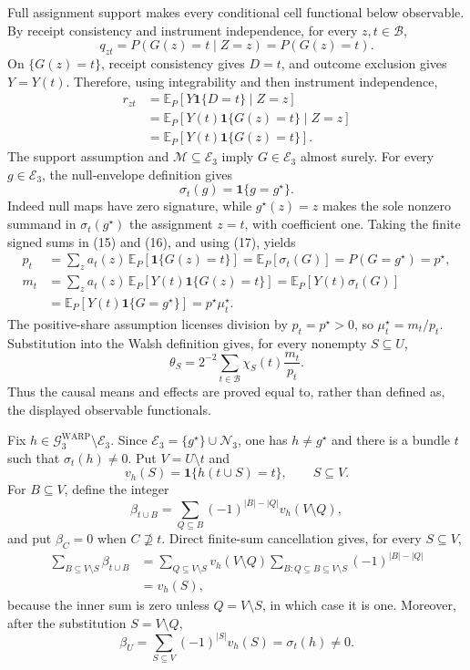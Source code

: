Full assignment support makes every conditional cell functional below observable.  By receipt consistency and instrument independence, for every \(z,t\in\mathcal B\),
\[
q_{zt}
=P(G(z)=t\mid Z=z)
=P(G(z)=t). \tag{15}
\]
On \(\{G(z)=t\}\), receipt consistency gives \(D=t\), and outcome exclusion gives \(Y=Y(t)\).  Therefore, using integrability and then instrument independence,
\[
\begin{aligned}
r_{zt}
&=\mathbb E_P\!\left[Y\mathbf 1\{D=t\}\mid Z=z\right]\\
&=\mathbb E_P\!\left[Y(t)\mathbf 1\{G(z)=t\}\mid Z=z\right]\\
&=\mathbb E_P\!\left[Y(t)\mathbf 1\{G(z)=t\}\right].
\end{aligned} \tag{16}
\]
The support assumption and \(\mathcal M\subseteq\mathcal E_3\) imply \(G\in\mathcal E_3\) almost surely.  For every \(g\in\mathcal E_3\), the null-envelope definition gives
\[
\sigma_t(g)=\mathbf 1\{g=g^\star\}. \tag{17}
\]
Indeed null maps have zero signature, while \(g^\star(z)=z\) makes the sole nonzero summand in \(\sigma_t(g^\star)\) the assignment \(z=t\), with coefficient one.  Taking the finite signed sums in (15) and (16), and using (17), yields
\[
\begin{aligned}
p_t
&=\sum_z a_t(z)\,\mathbb E_P[\mathbf 1\{G(z)=t\}]
=\mathbb E_P[\sigma_t(G)]
=P(G=g^\star)=p^\star,\\
m_t
&=\sum_z a_t(z)\,\mathbb E_P[Y(t)\mathbf 1\{G(z)=t\}]
=\mathbb E_P[Y(t)\sigma_t(G)]\\
&=\mathbb E_P[Y(t)\mathbf 1\{G=g^\star\}]
=p^\star\mu_t^\star.
\end{aligned} \tag{18}
\]
The positive-share assumption licenses division by \(p_t=p^\star>0\), so \(\mu_t^\star=m_t/p_t\).  Substitution into the Walsh definition gives, for every nonempty \(S\subseteq U\),
\[
\theta_S=2^{-2}\sum_{t\in\mathcal B}\chi_S(t)\frac{m_t}{p_t}.
\]
Thus the causal means and effects are proved equal to, rather than defined as, the displayed observable functionals.

Fix \(h\in\mathcal G^{\mathrm{WARP}}_3\setminus\mathcal E_3\).  Since \(\mathcal E_3=\{g^\star\}\cup\mathcal N_3\), one has \(h\ne g^\star\) and there is a bundle \(t\) such that \(\sigma_t(h)\ne0\).  Put \(V=U\setminus t\) and
\[
v_h(S)=\mathbf 1\{h(t\cup S)=t\},\qquad S\subseteq V.
\]
For \(B\subseteq V\), define the integer
\[
\beta_{t\cup B}=\sum_{Q\subseteq B}(-1)^{|B|-|Q|}v_h(V\setminus Q),
\]
and put \(\beta_C=0\) when \(C\not\supseteq t\).  Direct finite-sum cancellation gives, for every \(S\subseteq V\),
\[
\begin{aligned}
\sum_{B\subseteq V\setminus S}\beta_{t\cup B}
&=\sum_{Q\subseteq V\setminus S}v_h(V\setminus Q)
  \sum_{B:Q\subseteq B\subseteq V\setminus S}(-1)^{|B|-|Q|}\\
&=v_h(S),
\end{aligned} \tag{19}
\]
because the inner sum is zero unless \(Q=V\setminus S\), in which case it is one.  Moreover, after the substitution \(S=V\setminus Q\),
\[
\beta_U=\sum_{S\subseteq V}(-1)^{|S|}v_h(S)=\sigma_t(h)\ne0. \tag{20}
\]

